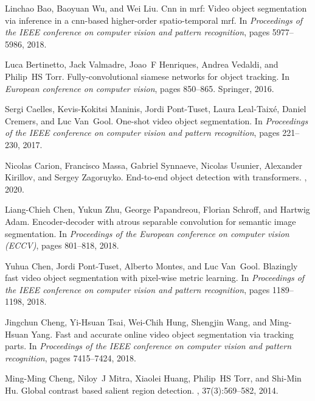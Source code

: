 \documentclass[final]{cvpr}
\begin{document}
{\small
\begin{thebibliography}{10}\itemsep=-1pt

Linchao Bao, Baoyuan Wu, and Wei Liu.
\newblock Cnn in mrf: Video object segmentation via inference in a cnn-based
  higher-order spatio-temporal mrf.
\newblock In {\em Proceedings of the IEEE conference on computer vision and
  pattern recognition}, pages 5977--5986, 2018.

Luca Bertinetto, Jack Valmadre, Joao~F Henriques, Andrea Vedaldi, and Philip~HS
  Torr.
\newblock Fully-convolutional siamese networks for object tracking.
\newblock In {\em European conference on computer vision}, pages 850--865.
  Springer, 2016.

Sergi Caelles, Kevis-Kokitsi Maninis, Jordi Pont-Tuset, Laura Leal-Taix{\'e},
  Daniel Cremers, and Luc Van~Gool.
\newblock One-shot video object segmentation.
\newblock In {\em Proceedings of the IEEE conference on computer vision and
  pattern recognition}, pages 221--230, 2017.

Nicolas Carion, Francisco Massa, Gabriel Synnaeve, Nicolas Usunier, Alexander
  Kirillov, and Sergey Zagoruyko.
\newblock End-to-end object detection with transformers.
, 2020.

Liang-Chieh Chen, Yukun Zhu, George Papandreou, Florian Schroff, and Hartwig
  Adam.
\newblock Encoder-decoder with atrous separable convolution for semantic image
  segmentation.
\newblock In {\em Proceedings of the European conference on computer vision
  (ECCV)}, pages 801--818, 2018.

Yuhua Chen, Jordi Pont-Tuset, Alberto Montes, and Luc Van~Gool.
\newblock Blazingly fast video object segmentation with pixel-wise metric
  learning.
\newblock In {\em Proceedings of the IEEE conference on computer vision and
  pattern recognition}, pages 1189--1198, 2018.

Jingchun Cheng, Yi-Hsuan Tsai, Wei-Chih Hung, Shengjin Wang, and Ming-Hsuan
  Yang.
\newblock Fast and accurate online video object segmentation via tracking
  parts.
\newblock In {\em Proceedings of the IEEE conference on computer vision and
  pattern recognition}, pages 7415--7424, 2018.

Ming-Ming Cheng, Niloy~J Mitra, Xiaolei Huang, Philip~HS Torr, and Shi-Min Hu.
\newblock Global contrast based salient region detection.
,
  37(3):569--582, 2014.


\end{thebibliography}}
\end{document}
